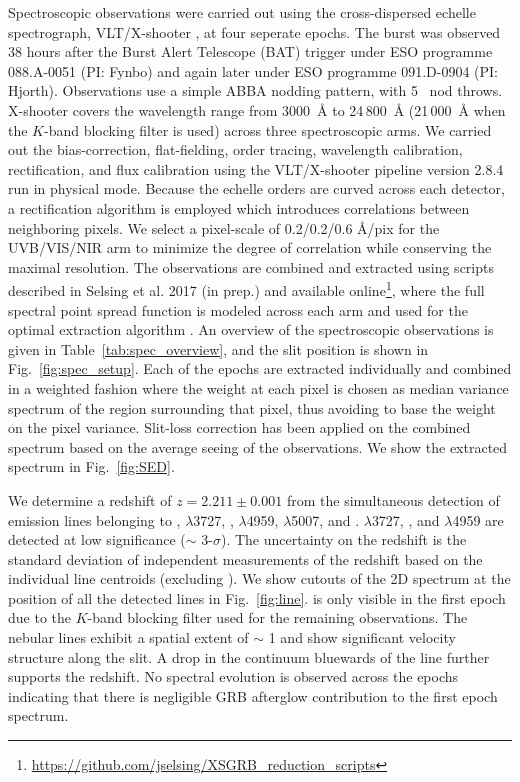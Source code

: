 \documentclass[referee]{aa}
\begin{document}
Spectroscopic observations were carried out using the cross-dispersed echelle
spectrograph, VLT/X-shooter \citep{Vernet2011}, at four seperate epochs. The
burst was observed 38 hours after the Burst Alert Telescope (BAT) trigger under
ESO programme 088.A-0051 (PI: Fynbo) and again later under ESO programme
091.D-0904 (PI: Hjorth). Observations use a simple ABBA nodding pattern, with 5
\arcsec~nod throws. X-shooter covers the wavelength range from 3000~\AA{} to
24\,800~\AA{} (21\,000~\AA{} when the $K$-band blocking filter is used) across
three spectroscopic arms. We carried out the bias-correction, flat-fielding,
order tracing, wavelength calibration, rectification, and flux calibration using
the VLT/X-shooter pipeline version 2.8.4 \citep{Goldoni2006, Modigliani2010} run
in physical mode. Because the echelle orders are curved across each detector, a
rectification algorithm is employed which introduces correlations between
neighboring pixels. We select a pixel-scale of 0.2/0.2/0.6 \AA/pix for the
UVB/VIS/NIR arm to minimize the degree of correlation while conserving the
maximal resolution. The observations are combined and extracted using scripts
described in Selsing et al. 2017 (in prep.) and available
online\footnote{\url{https://github.com/jselsing/XSGRB_reduction_scripts}},
where the full spectral point spread function is modeled across each arm and
used for the optimal extraction algorithm \citep{Horne1986}. An overview of the
spectroscopic observations is given in Table~\ref{tab:spec_overview}, and the
slit position is shown in Fig.~\ref{fig:spec_setup}. Each of the epochs are
extracted individually and combined in a weighted fashion where the weight at
each pixel is chosen as median variance spectrum of the region surrounding that
pixel, thus avoiding to base the weight on the pixel variance. Slit-loss
correction has been applied on the combined spectrum based on the average seeing
of the observations. We show the extracted spectrum in Fig.~\ref{fig:SED}.



We determine a redshift of $z = 2.211 \pm 0.001$ from the simultaneous detection
of emission lines belonging to \lya, \oii$\lambda$3727, \hb, \oiii$\lambda$4959,
\oiii$\lambda$5007, and \ha. \oii$\lambda$3727, \hb{}, and \oiii$\lambda$4959
are detected at low significance ($\sim$ 3-$\sigma$). The uncertainty on the
redshift is the standard deviation of independent measurements of the redshift
based on the individual line centroids (excluding \lya). We show cutouts of the
2D spectrum at the position of all the detected lines in Fig.~\ref{fig:line}. 
\ha{} is only visible in the first epoch due to the $K$-band blocking filter
used for the remaining observations. The nebular lines exhibit a spatial extent
of $\sim$ 1 and show significant velocity structure along the slit. A drop
in the continuum bluewards of the \lya{} line further supports the redshift. No
spectral evolution is observed across the epochs indicating that there is
negligible GRB afterglow contribution to the first epoch spectrum.
\end{document}
